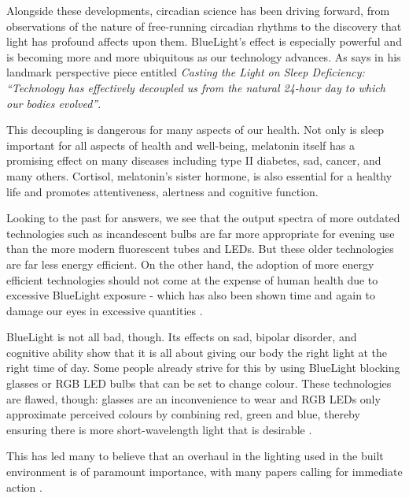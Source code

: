 Alongside these developments, circadian science has been driving forward, from observations of the nature of free-running circadian rhythms to the discovery that light has profound affects upon them. \Gls{BlueLight}'s effect is especially powerful and is becoming more and more ubiquitous as our technology advances. As \citet{czeislerPerspectiveCastingLight2013} says in his landmark perspective piece entitled \textit{Casting the Light on Sleep Deficiency: ``Technology has effectively decoupled us from the natural 24-hour day to which our bodies evolved''}. 

This decoupling is dangerous for many aspects of our health. Not only is sleep important for all aspects of health and well-being, melatonin itself has a promising effect on many diseases including type II diabetes, \acrshort{sad}, cancer, and many others. Cortisol, melatonin's sister hormone, is also essential for a healthy life and promotes attentiveness, alertness and cognitive function.

Looking to the past for answers, we see that the output spectra of more outdated technologies such as incandescent bulbs are far more appropriate for evening use than the more modern fluorescent tubes and LEDs. But these older technologies are far less energy efficient. On the other hand, the adoption of more energy efficient technologies should not come at the expense of human health \citep{boyceReviewImpactLight2010} due to excessive \gls{BlueLight} exposure - which has also been shown time and again to damage our eyes in excessive quantities \citep{uedaEyeDamageControl2009, kuseDamagePhotoreceptorderivedCells2014, niwanoBlueLightInjures2014, marekBlueLightPhototoxicity2018, nakamuraExposureExcessiveBlue2018}.

\Gls{BlueLight} is not all bad, though. Its effects on \acrshort{sad}, bipolar disorder, and cognitive ability show that it is all about giving our body the right light at the right time of day. Some people already strive for this by using \gls{BlueLight} blocking glasses or RGB LED bulbs that can be set to change colour. These technologies are flawed, though: glasses are an inconvenience to wear and RGB LEDs only approximate perceived colours by combining red, green and blue, thereby ensuring there is more short-wavelength light that is desirable \citep{gilewskiEcologicalHarmfulnessRGB2018}.

This has led many to believe that an overhaul in the lighting used in the built environment is of paramount importance, with many papers calling for immediate action \citep{webbConsiderationsLightingBuilt2006, boyceReviewImpactLight2010, groseArtificialLightNight2014}.




